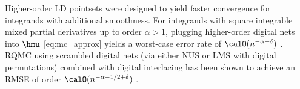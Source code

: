 \documentclass[acmsmall]{acmart}
\begin{document}
Higher-order LD pointsets were designed to yield faster convergence for integrands with additional smoothness. For integrands with square integrable mixed partial derivatives up to order $\alpha>1$, plugging higher-order digital nets into $\hmu$ \eqref{eq:mc_approx} yields a worst-case error rate of $\calO(n^{-\alpha+\delta})$ \citep{dick.walsh_spaces_HO_nets,dick.qmc_HO_convergence_MCQMC2008,dick.decay_walsh_coefficients_smooth_functions}. RQMC using scrambled digital nets (via either NUS or LMS with digital permutations) combined with digital interlacing has been shown to achieve an RMSE of order $\calO(n^{-\alpha-1/2+\delta})$ \citep{dick.higher_order_scrambled_digital_nets}. %


\end{document}
